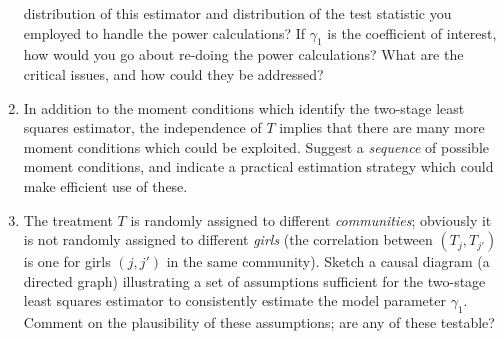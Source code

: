 \documentclass[12pt]{amsart}
\begin{document}
\begin{enumerate}
distribution of this estimator and distribution of the test
statistic you employed to handle the power calculations?  If
\(\gamma_1\) is the coefficient of interest, how would you go about
re-doing the power calculations?  What are the critical issues,
and how could they be addressed?
\item In addition to the moment conditions which identify the two-stage
least squares estimator, the independence of \(T\) implies that
there are many more moment conditions which could be exploited.
Suggest a \emph{sequence} of possible moment conditions, and indicate
a practical estimation strategy which could make efficient use of these.
\item The treatment \(T\) is randomly assigned to different
\emph{communities}; obviously it is not randomly assigned to different
\emph{girls} (the correlation between \((T_j,T_{j'})\) is one for girls
\((j,j')\) in the same community).  Sketch a causal diagram (a
directed graph) illustrating a set of assumptions sufficient for
the two-stage least squares estimator to consistently estimate
the model parameter \(\gamma_1\).  Comment on the plausibility of
these assumptions; are any of these testable?
\end{enumerate}
\end{document}
